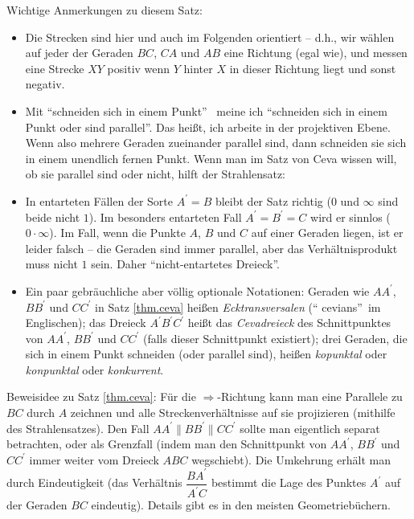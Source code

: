 \documentclass[12pt,final,notitlepage,onecolumn,german]{article}%
\theoremstyle{definition}
\theoremstyle{plainsl}
\begin{document}
Wichtige Anmerkungen zu diesem Satz:

\begin{itemize}
\item Die Strecken sind hier und auch im Folgenden orientiert -- d.h., wir
w\"{a}hlen auf jeder der Geraden $BC$, $CA$ und $AB$ eine Richtung (egal wie),
und messen eine Strecke $XY$ positiv wenn $Y$ hinter $X$ in dieser Richtung
liegt und sonst negativ.

\item Mit \textquotedblleft schneiden sich in einem Punkt\textquotedblright%
\ meine ich \textquotedblleft schneiden sich in einem Punkt oder sind
parallel\textquotedblright. Das hei\ss t, ich arbeite in der projektiven
Ebene. Wenn also mehrere Geraden zueinander parallel sind, dann schneiden sie
sich in einem unendlich fernen Punkt. Wenn man im Satz von Ceva wissen will,
ob sie parallel sind oder nicht, hilft der Strahlensatz:

\item In entarteten F\"{a}llen der Sorte $A^{\prime}=B$ bleibt der Satz
richtig ($0$ und $\infty$ sind beide nicht $1$). Im besonders entarteten Fall
$A^{\prime}=B^{\prime}=C$ wird er sinnlos ($0\cdot\infty$). Im Fall, wenn die
Punkte $A$, $B$ und $C$ auf einer Geraden liegen, ist er leider falsch -- die
Geraden sind immer parallel, aber das Verh\"{a}ltnisprodukt muss nicht $1$
sein. Daher \textquotedblleft nicht-entartetes Dreieck\textquotedblright.

\item Ein paar gebr\"{a}uchliche aber v\"{o}llig optionale Notationen: Geraden
wie $AA^{\prime}$, $BB^{\prime}$ und $CC^{\prime}$ in Satz \ref{thm.ceva}
hei\ss en \textit{Ecktransversalen} (\textquotedblleft
cevians\textquotedblright\ im Englischen); das Dreieck $A^{\prime}B^{\prime
}C^{\prime}$ hei\ss t das \textit{Cevadreieck} des Schnittpunktes von
$AA^{\prime}$, $BB^{\prime}$ und $CC^{\prime}$ (falls dieser Schnittpunkt
existiert); drei Geraden, die sich in einem Punkt schneiden (oder parallel
sind), hei\ss en \textit{kopunktal} oder \textit{konpunktal} oder
\textit{konkurrent}.
\end{itemize}

Beweisidee zu Satz \ref{thm.ceva}: F\"{u}r die $\Longrightarrow$-Richtung kann
man eine Parallele zu $BC$ durch $A$ zeichnen und alle
Streckenverh\"{a}ltnisse auf sie projizieren (mithilfe des Strahlensatzes).
Den Fall $AA^{\prime}\parallel BB^{\prime}\parallel CC^{\prime}$ sollte man
eigentlich separat betrachten, oder als Grenzfall (indem man den Schnittpunkt
von $AA^{\prime}$, $BB^{\prime}$ und $CC^{\prime}$ immer weiter vom Dreieck
$ABC$ wegschiebt). Die Umkehrung erh\"{a}lt man durch Eindeutigkeit (das
Verh\"{a}ltnis $\dfrac{BA^{\prime}}{A^{\prime}C}$ bestimmt die Lage des
Punktes $A^{\prime}$ auf der Geraden $BC$ eindeutig). Details gibt es in den
meisten Geometrieb\"{u}chern.
\end{document}
